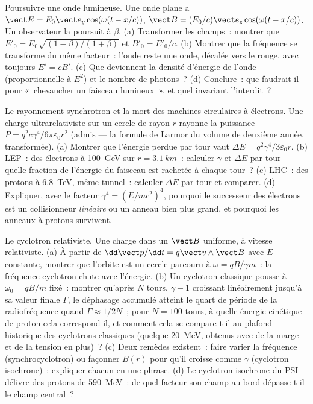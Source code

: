 \begin{exercise}[$\star\star\star$]\label{exo:b3:covariant-electromagnetism:10}
Poursuivre une onde lumineuse. Une onde plane a $\vect E = E_0\vect e_y
\cos(\omega(t - x/c))$, $\vect B = (E_0/c)\vect e_z\cos(\omega(t -
x/c))$. Un observateur la poursuit à $\beta$. (a) Transformer les
champs~: montrer que $E'_0 = E_0\sqrt{(1-\beta)/(1+\beta)}$ et
$B'_0 = E'_0/c$. (b) Montrer que la fréquence se transforme du même
facteur~: l'onde reste une onde, décalée vers le rouge, avec toujours
$E' = cB'$. (c) Que deviennent la densité d'énergie de l'onde
(proportionnelle à $E^2$) et le nombre de photons~? (d) Conclure~: que
faudrait-il pour «~chevaucher un faisceau lumineux~», et quel invariant
l'interdit~?
\end{exercise}

\begin{exercise}[$\star\star\star$]\label{exo:b3:covariant-electromagnetism:11}
Le rayonnement synchrotron et la mort des machines circulaires à
électrons. Une charge ultrarelativiste sur un cercle de rayon $r$
rayonne la puissance $P = q^2c\gamma^4/6\pi\varepsilon_0r^2$ (admis ---
la formule de Larmor du volume de deuxième année, transformée). (a)
Montrer que l'énergie perdue par tour vaut
$\Delta E = q^2\gamma^4/3\varepsilon_0r$. (b) LEP~: des électrons à
\qty{100}{GeV} sur $r = \qty{3.1}{km}$~: calculer $\gamma$ et
$\Delta E$ par tour --- quelle fraction de l'énergie du faisceau est
rachetée à chaque tour~? (c) LHC~: des protons à \qty{6.8}{TeV}, même
tunnel~: calculer $\Delta E$ par tour et comparer. (d) Expliquer, avec
le facteur $\gamma^4 =
(E/mc^2)^4$, pourquoi le successeur des électrons est un collisionneur
\emph{linéaire} ou un anneau bien plus grand, et pourquoi les anneaux à
protons survivent.
\end{exercise}

\begin{exercise}[$\star\star\star$]\label{exo:b3:covariant-electromagnetism:12}
Le cyclotron relativiste. Une charge dans un $\vect B$ uniforme, à
vitesse relativiste. (a) À partir de $\dd\vect p/\dd t = q\vect v\wedge\vect
B$ avec $E$ constante, montrer que l'orbite est un cercle parcouru à
$\omega = qB/\gamma m$~: la fréquence cyclotron chute avec l'énergie.
(b) Un cyclotron classique pousse à $\omega_0 = qB/m$ fixé~: montrer
qu'après $N$ tours, $\gamma - 1$ croissant linéairement jusqu'à sa
valeur finale $\Gamma$, le déphasage accumulé atteint le quart de
période de la radiofréquence quand $\Gamma \approx 1/2N$~; pour
$N = 100$ tours, à quelle énergie cinétique de proton cela
correspond-il, et comment cela se compare-t-il au plafond historique
des cyclotrons classiques (quelque \qty{20}{MeV}, obtenus avec de la
marge et de la tension en plus)~? (c) Deux remèdes existent~: faire
varier la fréquence (synchrocyclotron) ou façonner $B(r)$ pour qu'il
croisse comme $\gamma$ (cyclotron isochrone)~: expliquer chacun en une
phrase. (d) Le cyclotron isochrone du PSI délivre des protons de
\qty{590}{MeV}~: de quel facteur son champ au bord dépasse-t-il le
champ central~?
\end{exercise}

